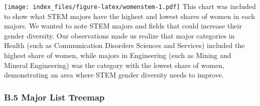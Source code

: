 \documentclass[
]{article}
\begin{document}
\texttt{[image: index\_files/figure-latex/womenstem-1.pdf]} This chart
was included to show what STEM majors have the highest and lowest shares
of women in each majors. We wanted to note STEM majors and fields that
could increase their gender diversity. Our observations made us realize
that major categories in Health (such as Communication Disorders
Sciences and Services) included the highest share of women, while majors
in Engineering (such as Mining and Mineral Engineering) was the category
with the lowest share of women, demonstrating an area where STEM gender
diversity needs to improve.

\hypertarget{b.5-major-list-treemap}{%
\subsubsection{B.5 \textbar{} Major List
Treemap}\label{b.5-major-list-treemap}}
\end{document}
